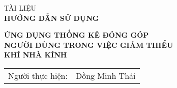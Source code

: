 
\begin{titlepage}
      
  \vspace*{\fill}
  \begin{center}
  \vspace{1.5cm}
  \fontsize{24pt}{0pt}\selectfont TÀI LIỆU \\ %
  \vspace{12pt}
  \textbf{\fontsize{32pt}{0pt}\selectfont HƯỚNG DẪN SỬ DỤNG} %
  \vspace{1.5cm}
  \end{center}
  \begin{center}
       \textbf{\fontsize{20pt}{0pt}\selectfont ỨNG DỤNG THỐNG KÊ ĐÓNG GÓP} \\
       \textbf{\fontsize{20pt}{0pt}\selectfont NGƯỜI DÙNG TRONG VIỆC GIẢM THIỂU } \\
       \textbf{\fontsize{20pt}{0pt}\selectfont KHÍ NHÀ KÍNH }
  \vspace{3cm}
  \begin{table}[H]%
       \centering
       \begin{tabular}{l l}
            \fontsize{14pt}{0pt}\selectfont Người thực hiện:      & \fontsize{14pt}{0pt}\selectfont Đồng Minh Thái\\

\end{tabular}
\end{table}
\end{center}
\end{titlepage}
